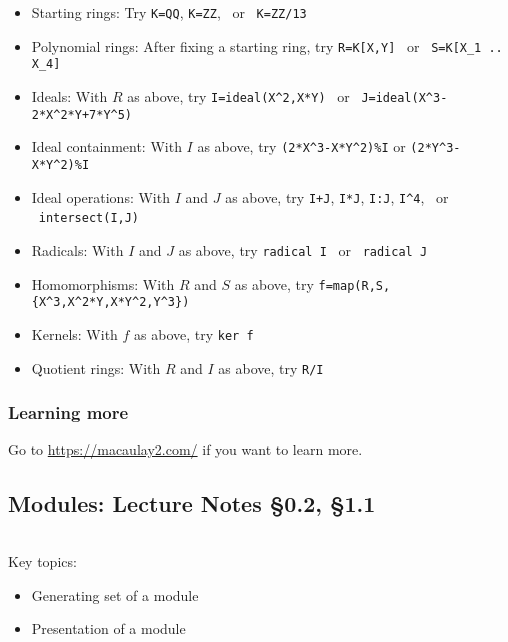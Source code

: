 \documentclass[12pt]{amsart}
\newcommand{\0}{$\phantom{.}$}
\newcommand{\1}{\mathbbm{1}}
\begin{document}
\begin{itemize}
\item Starting rings: Try \texttt{K=QQ}, \texttt{K=ZZ}, \ or \  \texttt{K=ZZ/13}
\item Polynomial rings: After fixing a starting ring, try \texttt{R=K[X,Y]} \ or \  {\verb|S=K[X_1 .. X_4]|}
\item Ideals: With $R$ as above, try \verb|I=ideal(X^2,X*Y)| \ or  \ \verb|J=ideal(X^3-2*X^2*Y+7*Y^5)|
\item Ideal containment: With $I$ as above, try \verb|(2*X^3-X*Y^2)%I| or \verb|(2*Y^3-X*Y^2)%I|
\item Ideal operations: With $I$ and $J$ as above, try \verb|I+J|, \verb|I*J|, \verb|I:J|, \verb|I^4|, \ or \ \verb|intersect(I,J)|
\item Radicals: With $I$ and $J$ as above, try \texttt{radical I} \ or \  \texttt{radical J}
\item Homomorphisms: With $R$ and $S$ as above, try \verb|f=map(R,S,{X^3,X^2*Y,X*Y^2,Y^3})|
\item Kernels: With $f$ as above, try \verb|ker f|
\item Quotient rings: With $R$ and $I$ as above, try \verb|R/I|
\end{itemize}


\subsubsection*{Learning more} Go to \url{https://macaulay2.com/} if you want to learn more.


\newpage








\subsection{Modules:  Lecture Notes \S0.2, \S1.1} \0


\begin{framed} Key topics:
\begin{itemize}
\item Generating set of a module
\item Presentation of a module
\end{itemize}
\end{framed}
\end{document}
